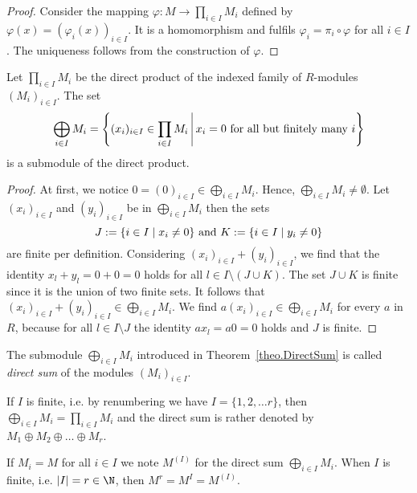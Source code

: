 \begin{proof}
Consider the mapping $\varphi\colon M\to \prod_{i\in I} M_i$ defined by $\varphi(x)=(\varphi_i(x))_{i\in I}$. It is a homomorphism and fulfils $\varphi_i=\pi_i\circ\varphi$ for all $i\in I$. The uniqueness follows from the construction of $\varphi$.
\end{proof}

\begin{theo}\label{theo.DirectSum}
Let $\prod_{i\in I} M_i$ be the direct product of the indexed family of $R$-modules $(M_i)_{i\in I}$. The set
\begin{equation*}
\bigoplus_{i\in I}M_i=\left\lbrace (x_i)_{i\in I}\in \prod_{i\in I} M_i \middle\arrowvert x_i=0 \textnormal{ for all but finitely many } i\right\rbrace
\end{equation*}
is a submodule of the direct product.
\end{theo}

\begin{proof}
At first, we notice $0=(0)_{i\in I}\in \bigoplus_{i\in I}M_i$. Hence, $\bigoplus_{i\in I}M_i\neq\emptyset$. Let $(x_i)_{i\in I}$ and $(y_i)_{i\in I}$ be in $\bigoplus_{i\in I}M_i$ then the sets
\begin{equation*}
J:=\lbrace i\in I\mid x_i\neq 0\rbrace \textnormal{ and } K:=\lbrace i\in I\mid y_i\neq 0\rbrace
\end{equation*} 
are finite per definition. Considering $(x_i)_{i\in I}+(y_i)_{i\in I}$, we find that the identity $x_l+y_l=0+0=0$ holds for all $l\in I\setminus (J\cup K)$. The set $J\cup K$ is finite since it is the union of two finite sets. It follows that $(x_i)_{i\in I}+(y_i)_{i\in I}\in \bigoplus_{i\in I}M_i$. We find $a(x_i)_{i\in I}\in \bigoplus_{i\in I}M_i$ for every $a$ in $R$, because for all $l\in I\setminus J$ the identity $ax_l=a0=0$ holds and $J$ is finite.
\end{proof}

\begin{defin}
\begin{compactenum}
\item The submodule $\bigoplus_{i\in I}M_i$ introduced in Theorem~\ref{theo.DirectSum} is called \emph{direct sum} of the modules $(M_i)_{i\in I}$.
\item If $I$ is finite, i.e. by renumbering we have $I=\lbrace 1,2,\ldots r\rbrace$, then $\bigoplus_{i\in I}M_i=\prod_{i\in I} M_i$ and the direct sum is rather denoted by $M_1\oplus M_2\oplus\ldots\oplus M_r$.
\item If $M_i=M$ for all $i\in I$ we note $M^{(I)}$ for the direct sum $\bigoplus_{i\in I}M_i$. When $I$ is finite, i.e. $|I|=r\in\N$, then $M^r=M^I=M^{(I)}$.
\end{compactenum}
\end{defin}


